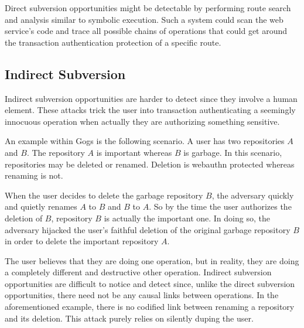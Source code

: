 Direct subversion opportunities might be detectable by performing route search and analysis similar to symbolic execution. Such a system could scan the web service's code and trace all possible chains of operations that could get around the transaction authentication protection of a specific route.

\subsection{Indirect Subversion}
Indirect subversion opportunities are harder to detect since they involve a human element. These attacks trick the user into transaction authenticating a seemingly innocuous operation when actually they are authorizing something sensitive. 

An example within Gogs is the following scenario. A user has two repositories $A$ and $B$. The repository $A$ is important whereas $B$ is garbage. In this scenario, repositories may be deleted or renamed. Deletion is webauthn protected whereas renaming is not.

When the user decides to delete the garbage repository $B$, the adversary quickly and quietly renames $A$ to $B$ and $B$ to $A$. So by the time the user authorizes the deletion of $B$, repository $B$ is actually the important one. In doing so, the adversary hijacked the user's faithful deletion of the original garbage repository $B$ in order to delete the important repository $A$. 

\iffalse
While the user is in the process of deleting a repository $B$, 
\fi

The user believes that they are doing one operation, but in reality, they are doing a completely different and destructive other operation. Indirect subversion opportunities are difficult to notice and detect since, unlike the direct subversion opportunities, there need not be any causal links between operations. In the aforementioned example, there is no codified link between renaming a repository and its deletion. This attack purely relies on silently duping the user.


